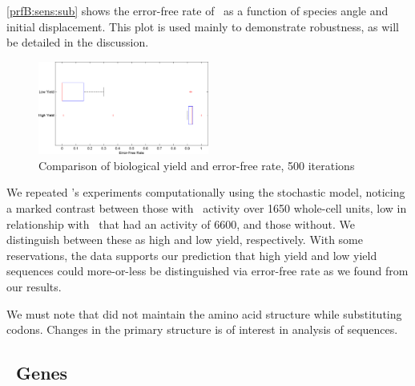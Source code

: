 \documentclass[12pt, draft]{article}
\numberwithin{equation}{section}
\begin{document}
\autoref{prfB:sens:sub} shows the error-free rate of \prfB\ as a function
of species angle and initial displacement.  This plot is used mainly to
demonstrate robustness, as will be detailed in the discussion.

\begin{figure}
  \caption{Comparison of biological yield and error-free rate, 500 iterations}
  \label{weissboxplot}
  \includegraphics[width=0.5\textwidth]{histograms/weissbox}
\end{figure}

We repeated \citeauthor{weiss87}'s experiments computationally
using the stochastic model, noticing a marked contrast between those
with \bgals\ activity over 1650 whole-cell units, low in
relationship with \prfB\ that had an activity of 6600, and those
without. We distinguish between these as high and low yield, respectively.
With some reservations, the data supports our prediction that high yield
and low yield sequences could more-or-less be distinguished via
error-free rate as we found from our results.

We must note that \citeauthor{weiss87} did not maintain the amino acid structure
while substituting codons.  Changes in the primary structure is of interest in
analysis of sequences.

\subsection{\ecoli\ Genes}
\begin{cfigure}
  \caption{Investigating a large sample of \ecoli\ genes}
  \quad
\end{cfigure}
\end{document}
